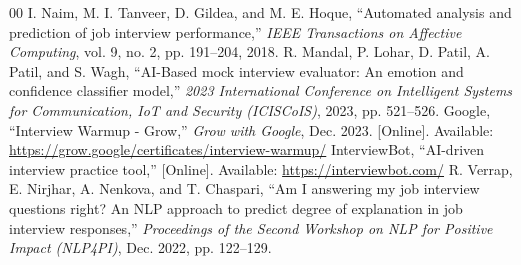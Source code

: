 \documentclass[conference]{IEEEtran}
\begin{document}
\begin{thebibliography}{00}
 I. Naim, M. I. Tanveer, D. Gildea, and M. E. Hoque, ``Automated analysis and prediction of job interview performance,'' \textit{IEEE Transactions on Affective Computing}, vol. 9, no. 2, pp. 191--204, 2018.
 R. Mandal, P. Lohar, D. Patil, A. Patil, and S. Wagh, ``AI-Based mock interview evaluator: An emotion and confidence classifier model,'' \textit{2023 International Conference on Intelligent Systems for Communication, IoT and Security (ICISCoIS)}, 2023, pp. 521--526.
 Google, ``Interview Warmup - Grow,'' \textit{Grow with Google}, Dec. 2023. [Online]. Available: \url{https://grow.google/certificates/interview-warmup/}
 InterviewBot, ``AI-driven interview practice tool,'' [Online]. Available: \url{https://interviewbot.com/}
 R. Verrap, E. Nirjhar, A. Nenkova, and T. Chaspari, ``Am I answering my job interview questions right? An NLP approach to predict degree of explanation in job interview responses,'' \textit{Proceedings of the Second Workshop on NLP for Positive Impact (NLP4PI)}, Dec. 2022, pp. 122--129.
\end{thebibliography}
\end{document}
